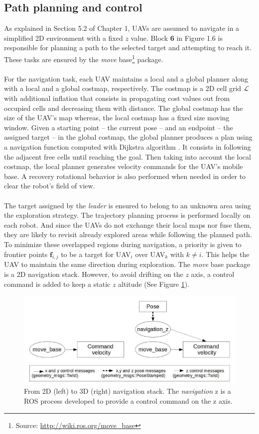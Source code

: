 \documentclass[11pt,openany]{book}
\begin{document}
\subsection{Path planning and control}
As explained in Section 5.2 of Chapter 1, UAVs are assumed to navigate in a simpliﬁed 2D environment with a ﬁxed $z$ value. Block \textbf{6} in Figure 1.6 is responsible for planning a path to the selected target and attempting to reach it. These tasks are ensured by the \textit{move} base\footnote{Source: \url{http://wiki.ros.org/move_base}} package.\\\\
For the navigation task, each UAV maintains a local and a global planner along with a local and a global costmap, respectively. The costmap is a 2D cell grid $\mathcal{L}$ with additional inﬂation that consists in propagating cost values out from occupied cells and decreasing them with distance. The global costmap has the size of the UAV’s map whereas, the local costmap has a ﬁxed size moving window. Given a starting point – the current pose – and an endpoint – the assigned target – in the global costmap, the global planner produces a plan using a navigation function computed with Dijkstra algorithm \cite{dijkstra1959note}. It consists in following the adjacent free cells until reaching the goal. Then taking into account the local costmap, the local planner generates velocity commands for the UAV’s mobile base. A recovery rotational behavior is also performed when needed in order to clear the robot’s ﬁeld of view.\\\\
The target assigned by the \textit{leader} is ensured to belong to an unknown area using the exploration strategy. The trajectory planning process is performed locally on each robot. And since the UAVs do not exchange their local maps nor fuse them, they are likely to revisit already explored areas while following the planned path. To minimize these overlapped regions during navigation, a priority is given to frontier points $\mathbf{f}_{i,j}$ to be a target for UAV$_i$ over UAV$_k$ with $k \neq i$. This helps the UAV to maintain the same direction during exploration. The \textit{move} base package is a 2D navigation stack. However, to avoid drifting on the $z$ axis, a control command is added to keep a static $z$ altitude (See Figure \ref{fig:3.10}).
\begin{figure}[H]
    \centering
    \includegraphics[scale=0.4]{assets/3_10.png}
    \caption{From 2D (left) to 3D (right) navigation stack. The \textit{navigation} z is a ROS process developed to provide a control command on the z axis.}
    \label{fig:3.10}
\end{figure}
\end{document}
